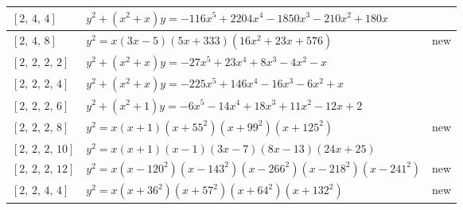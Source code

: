 \documentclass[11pt]{amsart}
\begin{document}
\begin{longtable}{|>{\raggedright\arraybackslash}p{1.7cm}|>{\raggedright\arraybackslash}p{}|>{\raggedright\arraybackslash}p{2.1cm}|}
$[2,\,4,\,4]$ & \href{https://alpha.lmfdb.org/Genus2Curve/Q/?jump=[[0,180,-210,-1850,2204,-116],[0,1,1]]}{$y^2 + (x^{2}+x)y = -116x^{5}+2204x^{4}-1850x^{3}-210x^{2}+180x$} & \cite{BookerSutherland}\\ \hline
$[2,\,4,\,8]$ & $y^2 = x(3x-5)(5x+333)(16x^2+23x+576)$ & new\\ \hline
$[2,\,2,\,2,\,2]$ & \href{https://alpha.lmfdb.org/Genus2Curve/Q/?jump=[[0,-1,-4,8,23,-27],[0,1,1]]}{$y^2 + (x^{2}+x)y = -27x^{5}+23x^{4}+8x^{3}-4x^{2}-x$} & \cite{BookerSutherland}\\ \hline
$[2,\,2,\,2,\,4]$ & \href{https://alpha.lmfdb.org/Genus2Curve/Q/?jump=[[0,1,-6,-16,146,-225],[0,1,1]]}{$y^2 + (x^{2}+x)y = -225x^{5}+146x^{4}-16x^{3}-6x^{2}+x$} & \cite{BookerSutherland}\\ \hline
$[2,\,2,\,2,\,6]$ & \href{https://alpha.lmfdb.org/Genus2Curve/Q/?jump=[[2,-12,11,18,-14,-6],[1,0,1]]}{$y^2 + (x^{2}+1)y = -6x^{5}-14x^{4}+18x^{3}+11x^{2}-12x+2$} & \cite{BookerSutherland}\\ \hline
$[2,\,2,\,2,\,8]$ & $y^2 = x(x+1)(x+55^2)(x+99^2)(x+125^2)$ & new\\ \hline
$[2,\,2,\,2,\,10]$ & $y^2 = x(x+1)(x-1)(3x-7)(8x-13)(24x+25)$ & \cite{Elkies2024}\\ \hline
$[2,\,2,\,2,\,12]$ & $y^2 = x(x-120^2)(x-143^2)(x-266^2)(x-218^2)(x-241^2)$ & new\\ \hline
$[2,\,2,\,4,\,4]$ & $y^2 = x(x+36^2)(x+57^2)(x+64^2)(x+132^2)$ & new\\ \hline
\end{longtable}
\endgroup
\end{document}
